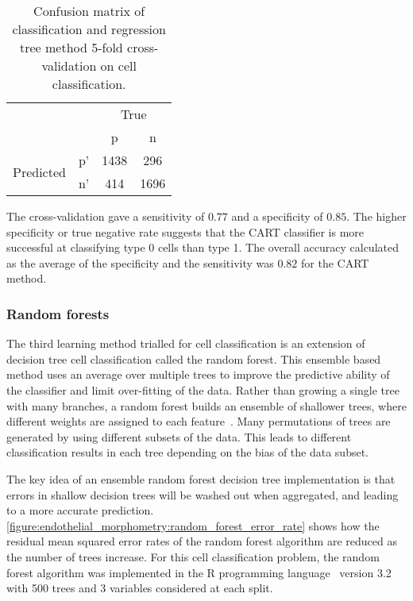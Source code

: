 \begin{table}[htbp]
\caption[Confusion matrix of CART cross-validation on cell classification]{Confusion matrix of classification and regression tree method 5-fold cross-validation on cell classification.}
\label{table:endothelial_morphometry:cart_confusion_matrix}
\centering
\begin{tabular}{cc|cc}
	\multicolumn{2}{c}{}&\multicolumn{2}{c}{True}\\
	\multicolumn{2}{c|}{}& p & n\\
	\cline{2-4}
	\multirow{2}{*}{Predicted}& p' & 1438 & 296\\ & n' & 414 & 1696\\
\end{tabular}
\end{table}

The cross-validation gave a sensitivity of $0.77$ and a specificity of $0.85$. The higher specificity or true negative rate suggests that the CART classifier is more successful at classifying type 0 cells than type 1. The overall accuracy calculated as the average of the specificity and the sensitivity was $0.82$ for the CART method.

\subsubsection{Random forests}
The third learning method trialled for cell classification is an extension of decision tree cell classification called the random forest. This ensemble based method uses an average over multiple trees to improve the predictive ability of the classifier and limit over-fitting of the data. Rather than growing a single tree with many branches, a random forest builds an ensemble of shallower trees, where different weights are assigned to each feature~\cite{Breiman2001}. Many permutations of trees are generated by using different subsets of the data. This leads to different classification results in each tree depending on the bias of the data subset.

The key idea of an ensemble random forest decision tree implementation is that errors in shallow decision trees will be washed out when aggregated, and leading to a more accurate prediction. \autoref{figure:endothelial_morphometry:random_forest_error_rate} shows how the residual mean squared error rates of the random forest algorithm are reduced as the number of trees increase. For this cell classification problem, the random forest algorithm was implemented in the R programming language~\cite{RCoreTeam2014} version 3.2 with 500 trees and 3 variables considered at each split.

